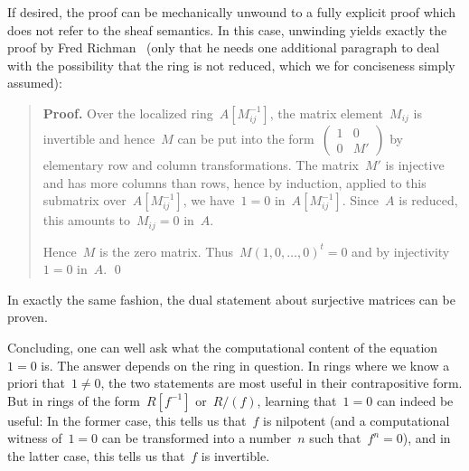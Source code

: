 \documentclass{ws-rv9x6}
\begin{document}
{If desired, the proof can be mechanically unwound to a fully explicit proof
which does not refer to the sheaf semantics. In this case, unwinding yields
exactly the proof by Fred Richman~\cite[Theorem~2]{richman:trivial-rings} (only
that he needs one additional paragraph to deal with the possibility that the
ring is not reduced, which we for conciseness simply assumed):

\begin{quote}
\textbf{Proof.} Over the localized
ring~$A[M_{ij}^{-1}]$, the matrix element~$M_{ij}$ is invertible and hence~$M$ can be
put into the form~$\left(\begin{smallmatrix}1&0\\0&M'\end{smallmatrix}\right)$
by elementary row and column transformations. The matrix~$M'$ is injective and
has more columns than rows, hence by induction, applied to this submatrix
over~$A[M_{ij}^{-1}]$, we have~$1 = 0$ in~$A[M_{ij}^{-1}]$. Since~$A$ is
reduced, this amounts to~$M_{ij} = 0$ in~$A$.

Hence~$M$ is the zero matrix. Thus~$M(1,0,\ldots,0)^t = 0$ and by
injectivity~$1 = 0$ in~$A$. \qed
\end{quote}

In exactly the same fashion, the dual statement about surjective matrices can
be proven.

Concluding, one can well ask what the computational content of the equation~$1
= 0$ is. The answer depends on the ring in question. In rings where we know a
priori that~$1 \neq 0$, the two statements are most useful in their
contrapositive form. But in rings of the form~$R[f^{-1}]$ or~$R/(f)$, learning
that~$1 = 0$ can indeed be useful: In the former case, this tells us that~$f$
is nilpotent (and a computational witness of~$1 = 0$ can be transformed into a
number~$n$ such that~$f^n = 0$), and in the latter case, this tells us that~$f$
is invertible.


}
\end{document}

